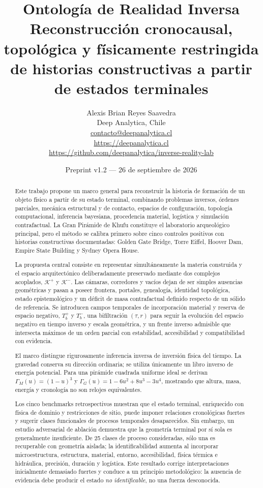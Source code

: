 \documentclass[11pt,a4paper]{article}
\title{\textbf{Ontología de Realidad Inversa}\\[0.35em]
\large Reconstrucción cronocausal, topológica y físicamente restringida de historias constructivas a partir de estados terminales}
\author{
Alexis Brian Reyes Saavedra\\
Deep Analytica, Chile\\
\href{mailto:contacto@deepanalytica.cl}{contacto@deepanalytica.cl}\\
\url{https://deepanalytica.cl}\\
\url{https://github.com/deepanalytica/inverse-reality-lab}
}
\date{Preprint v1.2 --- 26 de septiembre de 2026}
\begin{document}
\maketitle

\begin{abstract}
Este trabajo propone un marco general para reconstruir la historia de formación de un objeto físico a partir de su estado terminal, combinando problemas inversos, órdenes parciales, mecánica estructural y de contacto, espacios de configuración, topología computacional, inferencia bayesiana, procedencia material, logística y simulación contrafactual. La Gran Pirámide de Khufu constituye el laboratorio arqueológico principal, pero el método se calibra primero sobre cinco controles positivos con historias constructivas documentadas: Golden Gate Bridge, Torre Eiffel, Hoover Dam, Empire State Building y Sydney Opera House.

La propuesta central consiste en representar simultáneamente la materia construida y el espacio arquitectónico deliberadamente preservado mediante dos complejos acoplados, \(\mathcal K^+\) y \(\mathcal K^-\). Las cámaras, corredores y vacíos dejan de ser simples ausencias geométricas y pasan a poseer frontera, portales, genealogía, identidad topológica, estado epistemológico y un déficit de masa contrafactual definido respecto de un sólido de referencia. Se introducen campos temporales de incorporación material y reserva de espacio negativo, \(T_b^+\) y \(T_b^-\), una bifiltración \((\tau,r)\) para seguir la evolución del espacio negativo en tiempo inverso y escala geométrica, y un frente inverso admisible que intersecta máximos de un orden parcial con estabilidad, accesibilidad y compatibilidad con evidencia.

El marco distingue rigurosamente inferencia inversa de inversión física del tiempo. La gravedad conserva su dirección ordinaria; se utiliza únicamente un libro inverso de energía potencial. Para una pirámide cuadrada uniforme ideal se derivan \(\Gamma_M(u)=(1-u)^3\) y \(\Gamma_G(u)=1-6u^2+8u^3-3u^4\), mostrando que altura, masa, energía y cronología no son relojes equivalentes.

Los cinco benchmarks retrospectivos muestran que el estado terminal, enriquecido con física de dominio y restricciones de sitio, puede imponer relaciones cronológicas fuertes y sugerir clases funcionales de procesos temporales desaparecidos. Sin embargo, un estudio adversarial de ablación demuestra que la geometría terminal por sí sola es generalmente insuficiente. De 25 clases de proceso consideradas, sólo una es recuperable con geometría aislada; la identificabilidad aumenta al incorporar microestructura, estructura, material, entorno, accesibilidad, física térmica e hidráulica, precisión, duración y logística. Este resultado corrige interpretaciones inicialmente demasiado fuertes y conduce a un principio metodológico: la ausencia de evidencia debe producir el estado \emph{no identificable}, no una fuerza desconocida.


\end{abstract}
\end{document}
